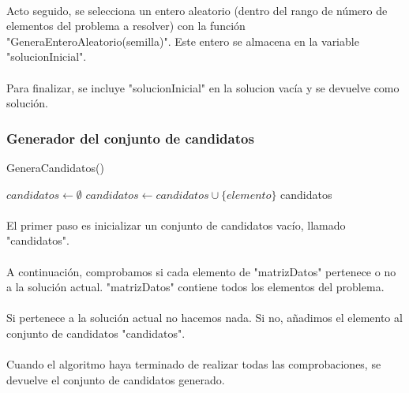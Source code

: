 \documentclass{article}
\begin{document}
	\paragraph{}Acto seguido, se selecciona un entero aleatorio (dentro del rango de número de elementos del problema a resolver) con la función "GeneraEnteroAleatorio(semilla)". Este entero se almacena en la variable "solucionInicial".
	
	\paragraph{}Para finalizar, se incluye "solucionInicial" en la solucion vacía y se devuelve como solución.
	
	\subsubsection{Generador del conjunto de candidatos}
	\begin{algorithm}[H]
		\caption{GeneraCandidatos()}
		\begin{algorithmic}
			\STATE $candidatos \leftarrow \emptyset$
			\STATE $candidatos \leftarrow candidatos \cup \{elemento\}$
			\ENDIF
			\ENDFOR
			\RETURN candidatos
		\end{algorithmic}
	\end{algorithm}
	
	\paragraph{}El primer paso es inicializar un conjunto de candidatos vacío, llamado "candidatos".
	
	\paragraph{}A continuación, comprobamos si cada elemento de "matrizDatos" pertenece o no a la solución actual. "matrizDatos" contiene todos los elementos del problema.
	
	\paragraph{}Si pertenece a la solución actual no hacemos nada. Si no, añadimos el elemento al conjunto de candidatos "candidatos".
	
	\paragraph{}Cuando el algoritmo haya terminado de realizar todas las comprobaciones, se devuelve el conjunto de candidatos generado.
	
\end{document}
